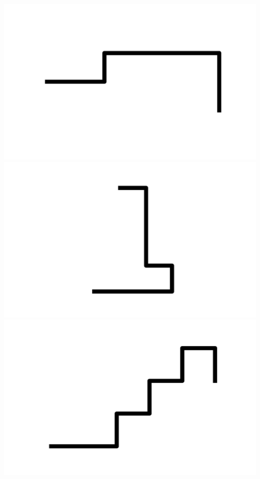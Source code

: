 \documentclass[]{report}
\begin{document}
\includegraphics[scale=.1]{pictures/21/state_cluster_shapes_127.pdf} 
\includegraphics[scale=.1]{pictures/21/state_cluster_shapes_128.pdf} 
\includegraphics[scale=.1]{pictures/21/state_cluster_shapes_129.pdf} 
\end{document}
